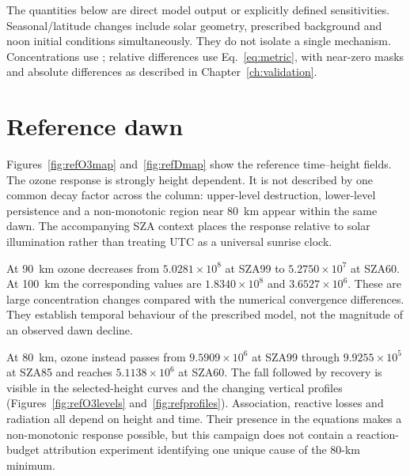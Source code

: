 The quantities below are direct model output or explicitly defined sensitivities. Seasonal/latitude changes include solar geometry, prescribed background and noon initial conditions simultaneously. They do not isolate a single mechanism. Concentrations use \concunit; relative differences use Eq.~\eqref{eq:metric}, with near-zero masks and absolute differences as described in Chapter~\ref{ch:validation}.

\section{Reference dawn}\label{sec:refresults}
Figures~\ref{fig:refO3map} and~\ref{fig:refDmap} show the reference time--height fields. The ozone response is strongly height dependent. It is not described by one common decay factor across the column: upper-level destruction, lower-level persistence and a non-monotonic region near 80~km appear within the same dawn. The accompanying SZA context places the response relative to solar illumination rather than treating UTC as a universal sunrise clock.


At 90~km ozone decreases from $5.0281\times10^8$ at SZA99 to $5.2750\times10^7$ at SZA60. At 100~km the corresponding values are $1.8340\times10^8$ and $3.6527\times10^6$. These are large concentration changes compared with the numerical convergence differences. They establish temporal behaviour of the prescribed model, not the magnitude of an observed dawn decline.

At 80~km, ozone instead passes from $9.5909\times10^6$ at SZA99 through $9.9255\times10^5$ at SZA85 and reaches $5.1138\times10^6$ at SZA60. The fall followed by recovery is visible in the selected-height curves and the changing vertical profiles (Figures~\ref{fig:refO3levels} and~\ref{fig:refprofiles}). Association, reactive losses and radiation all depend on height and time. Their presence in the equations makes a non-monotonic response possible, but this campaign does not contain a reaction-budget attribution experiment identifying one unique cause of the 80-km minimum.

